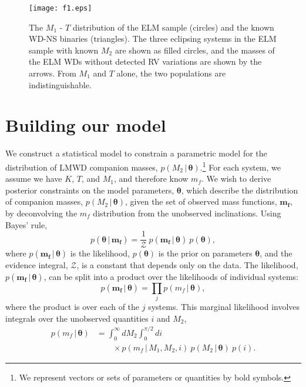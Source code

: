 \documentclass[apjl]{emulateapj}
\newcommand{\given}{\,|\,}
\newcommand{\bs}[1]{\boldsymbol{#1}}
\newcommand{\period}{T}
\newcommand{\mf}{m_f}
\begin{document}
\begin{figure}[h!]
\begin{center}
\texttt{[image: f1.eps]}
\caption{The $M_1$ - $\period$ distribution of the ELM sample (circles) and the known WD-NS binaries (triangles). The three eclipsing systems in the ELM sample with known $M_2$ are shown as filled circles, and the masses of the ELM WDs without detected RV variations are shown by the arrows. From $M_1$ and $\period$ alone, the two populations are indistinguishable.}
\label{fig:Porb-M1}
\end{center}
\end{figure}

\section{Building our model}
We construct a statistical model to constrain a parametric model for the distribution of LMWD companion masses, $p(M_2 \given \bs{\theta})$.\footnote{We represent vectors or sets of parameters or quantities by bold symbols.} For each system, we assume we have $K$, $T$, and $M_1$, and therefore know $\mf$. We wish to derive posterior constraints on the model parameters, $\bs{\theta}$, which describe the distribution of companion masses, $p(M_2\given \bs{\theta})$, given the set of observed mass functions, $\bs{m_f}$, by deconvolving the $\mf$ distribution from the unobserved inclinations. Using Bayes' rule,
\begin{equation}
    p(\bs{\theta} \given \bs{\mf}) = \frac{1}{\mathcal{Z}}~p(\bs{\mf} \given \bs{\theta})~p(\bs{\theta}),
\end{equation}
where $p(\bs{\mf} \given \bs{\theta})$ is the likelihood, $p(\bs{\theta})$ is the prior on parameters $\bs{\theta}$, and the evidence integral, $\mathcal{Z}$, is a constant that depends only on the data. The likelihood, $p(\bs{\mf} \given \bs{\theta})$, can be split into a product over the likelihoods of individual systems:
\begin{equation}
p(\bs{\mf} \given \bs{\theta}) = \prod_j p(\mf \given \bs{\theta}),
\end{equation}
where the product is over each of the $j$ systems.  This marginal likelihood involves integrals over the unobserved quantities $i$ and $M_2$,
\begin{align}
    p(\mf \given \bs{\theta}) &= \int_0^\infty dM_2 \int_0^{\pi/2} di  \nonumber \\
      & \qquad {} \times p(\mf \given M_1, M_2, i)~p(M_2 \given \bs{\theta})~p(i).
\end{align}
\end{document}
